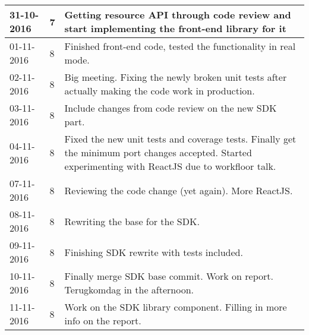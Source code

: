 \begin{tabular}{|p{2cm}|p{1cm}|p{10cm}|}
	31-10-2016 & 7 & Getting resource API through code review and start implementing the front-end library for it \\ \hline
	01-11-2016 & 8 & Finished front-end code, tested the functionality in real mode. \\ \hline
	02-11-2016 & 8 & Big meeting. Fixing the newly broken unit tests after actually making the code work in production. \\ \hline
	03-11-2016 & 8 & Include changes from code review on the new SDK part. \\ \hline
	04-11-2016 & 8 & Fixed the new unit tests and coverage tests. Finally get the minimum port changes accepted. Started experimenting with ReactJS due to workfloor talk. \\ \hline
	
	07-11-2016 & 8 & Reviewing the code change (yet again). More ReactJS. \\ \hline
	08-11-2016 & 8 & Rewriting the base for the SDK. \\ \hline
	09-11-2016 & 8 & Finishing SDK rewrite with tests included. \\ \hline
	10-11-2016 & 8 & Finally merge SDK base commit. Work on report. Terugkomdag in the afternoon. \\ \hline
	11-11-2016 & 8 & Work on the SDK library component. Filling in more info on the report. \\ \hline
	
\end{tabular}

